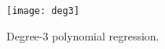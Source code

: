 \begin{answer}
\begin{figure}[H]
	\centering
	\texttt{[image: deg3]}
	\caption{Degree-3 polynomial regression.}
\end{figure}
\end{answer}
